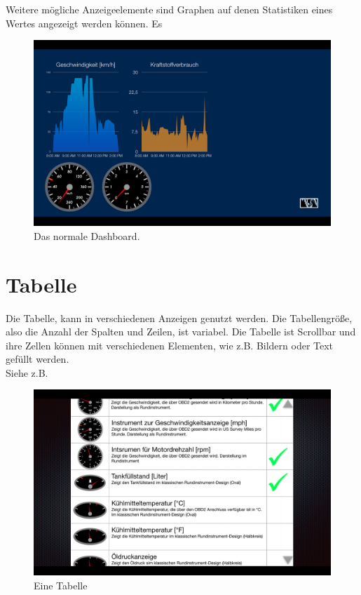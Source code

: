 \documentclass[pflichtenheft.tex]{subfiles}
\begin{document}
Weitere mögliche Anzeigeelemente sind Graphen auf denen Statistiken eines Wertes angezeigt werden können. Es 
\begin{figure}[h]
  	\begin{center}
 		\includegraphics[width=\textwidth]{Images/GUI-DashStatistic.png}
  		\caption{Das normale Dashboard.}
  	\end{center}
\end{figure}

\clearpage
\section{Tabelle}

Die Tabelle, kann in verschiedenen Anzeigen genutzt werden. Die Tabellengröße, also die Anzahl der Spalten und Zeilen, ist variabel. Die Tabelle ist Scrollbar und ihre Zellen können mit verschiedenen Elementen, wie z.B. Bildern oder Text gefüllt werden. \\
Siehe z.B. ~

\begin{figure}[h]
  	\begin{center}
 		\includegraphics[width=\textwidth]{Images/GUI-Table.png}
  		\caption{Eine Tabelle}
  	\end{center}
\end{figure}
\end{document}
